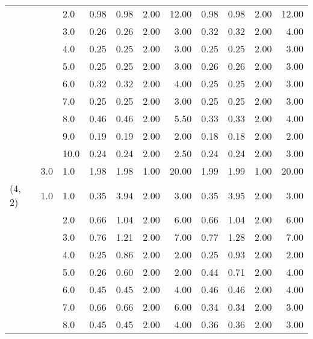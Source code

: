 \begin{tabular}{lllrrrrrrrr}
       &     & 2.0  &       0.98 &      0.98 & 2.00 &  12.00 &       0.98 &      0.98 & 2.00 &  12.00 \\
       &     & 3.0  &       0.26 &      0.26 & 2.00 &   3.00 &       0.32 &      0.32 & 2.00 &   4.00 \\
       &     & 4.0  &       0.25 &      0.25 & 2.00 &   3.00 &       0.25 &      0.25 & 2.00 &   3.00 \\
       &     & 5.0  &       0.25 &      0.25 & 2.00 &   3.00 &       0.26 &      0.26 & 2.00 &   3.00 \\
       &     & 6.0  &       0.32 &      0.32 & 2.00 &   4.00 &       0.25 &      0.25 & 2.00 &   3.00 \\
       &     & 7.0  &       0.25 &      0.25 & 2.00 &   3.00 &       0.25 &      0.25 & 2.00 &   3.00 \\
       &     & 8.0  &       0.46 &      0.46 & 2.00 &   5.50 &       0.33 &      0.33 & 2.00 &   4.00 \\
       &     & 9.0  &       0.19 &      0.19 & 2.00 &   2.00 &       0.18 &      0.18 & 2.00 &   2.00 \\
       &     & 10.0 &       0.24 &      0.24 & 2.00 &   2.50 &       0.24 &      0.24 & 2.00 &   3.00 \\
       & 3.0 & 1.0  &       1.98 &      1.98 & 1.00 &  20.00 &       1.99 &      1.99 & 1.00 &  20.00 \\
(4, 2) & 1.0 & 1.0  &       0.35 &      3.94 & 2.00 &   3.00 &       0.35 &      3.95 & 2.00 &   3.00 \\
       &     & 2.0  &       0.66 &      1.04 & 2.00 &   6.00 &       0.66 &      1.04 & 2.00 &   6.00 \\
       &     & 3.0  &       0.76 &      1.21 & 2.00 &   7.00 &       0.77 &      1.28 & 2.00 &   7.00 \\
       &     & 4.0  &       0.25 &      0.86 & 2.00 &   2.00 &       0.25 &      0.93 & 2.00 &   2.00 \\
       &     & 5.0  &       0.26 &      0.60 & 2.00 &   2.00 &       0.44 &      0.71 & 2.00 &   4.00 \\
       &     & 6.0  &       0.45 &      0.45 & 2.00 &   4.00 &       0.46 &      0.46 & 2.00 &   4.00 \\
       &     & 7.0  &       0.66 &      0.66 & 2.00 &   6.00 &       0.34 &      0.34 & 2.00 &   3.00 \\
       &     & 8.0  &       0.45 &      0.45 & 2.00 &   4.00 &       0.36 &      0.36 & 2.00 &   3.00 \\

\end{tabular}
